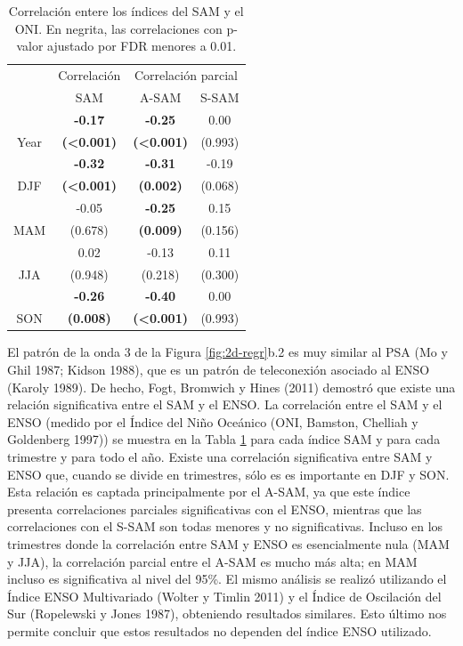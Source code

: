 \documentclass[12pt,oneside,a4paper]{reedthesis}
\begin{document}
\begin{table}

\caption{\label{tab:enso-cor-table}Correlación entere los índices del SAM y el ONI. En negrita, las correlaciones con p-valor ajustado por FDR menores a 0.01.}
\centering
\begin{tabular}[t]{c>{}c>{}c>{}c}
\toprule
\multicolumn{1}{c}{ } & \multicolumn{1}{c}{Correlación} & \multicolumn{2}{c}{Correlación parcial} \\
\cmidrule(l{3pt}r{3pt}){2-2} \cmidrule(l{3pt}r{3pt}){3-4}
 & SAM & A-SAM & S-SAM\\
\midrule
 & \textbf{-0.17} & \textbf{-0.25} & 0.00\\
\cmidrule{2-4}
\multirow[t]{-2}{*}{\centering\arraybackslash Year} & \textbf{(<0.001)} & \textbf{(<0.001)} & (0.993)\\
\cmidrule{1-4}
 & \textbf{-0.32} & \textbf{-0.31} & -0.19\\
\cmidrule{2-4}
\multirow[t]{-2}{*}{\centering\arraybackslash DJF} & \textbf{(<0.001)} & \textbf{(0.002)} & (0.068)\\
\cmidrule{1-4}
 & -0.05 & \textbf{-0.25} & 0.15\\
\cmidrule{2-4}
\multirow[t]{-2}{*}{\centering\arraybackslash MAM} & (0.678) & \textbf{(0.009)} & (0.156)\\
\cmidrule{1-4}
 & 0.02 & -0.13 & 0.11\\
\cmidrule{2-4}
\multirow[t]{-2}{*}{\centering\arraybackslash JJA} & (0.948) & (0.218) & (0.300)\\
\cmidrule{1-4}
 & \textbf{-0.26} & \textbf{-0.40} & 0.00\\
\cmidrule{2-4}
\multirow[t]{-2}{*}{\centering\arraybackslash SON} & \textbf{(0.008)} & \textbf{(<0.001)} & (0.993)\\
\bottomrule
\end{tabular}
\end{table}

El patrón de la onda 3 de la Figura \ref{fig:2d-regr}b.2 es muy similar al PSA (Mo y Ghil 1987; Kidson 1988), que es un patrón de teleconexión asociado al ENSO (Karoly 1989).
De hecho, Fogt, Bromwich y Hines (2011) demostró que existe una relación significativa entre el SAM y el ENSO.
La correlación entre el SAM y el ENSO (medido por el Índice del Niño Oceánico (ONI, Bamston, Chelliah y Goldenberg 1997)) se muestra en la Tabla \ref{tab:enso-cor-table} para cada índice SAM y para cada trimestre y para todo el año.
Existe una correlación significativa entre SAM y ENSO que, cuando se divide en trimestres, sólo es es importante en DJF y SON.
Esta relación es captada principalmente por el A-SAM, ya que este índice presenta correlaciones parciales significativas con el ENSO, mientras que las correlaciones con el S-SAM son todas menores y no significativas.
Incluso en los trimestres donde la correlación entre SAM y ENSO es esencialmente nula (MAM y JJA), la correlación parcial entre el A-SAM es mucho más alta; en MAM incluso es significativa al nivel del 95\%.
El mismo análisis se realizó utilizando el Índice ENSO Multivariado (Wolter y Timlin 2011) y el Índice de Oscilación del Sur (Ropelewski y Jones 1987), obteniendo resultados similares.
Esto último nos permite concluir que estos resultados no dependen del índice ENSO utilizado.
\end{document}
